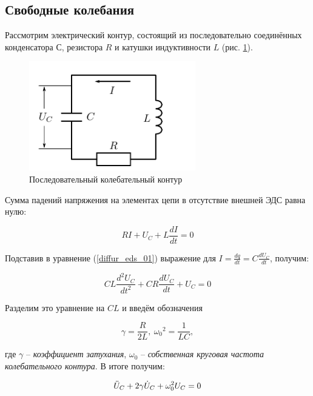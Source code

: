\documentclass[a4paper, 12pt]{article}
\begin{document}
    \subsection{Свободные колебания}

    Рассмотрим электрический контур, состоящий из последовательно соединённых конденсатора $С$, резистора $R$ и катушки индуктивности $L$ (рис. \ref{circuit1}).

    \begin{figure}[H]
        \centering
        \includegraphics{images/circuit_1.png}
        \caption{Последовательный колебательный контур}
        \label{circuit1}
    \end{figure}

    Сумма падений напряжения на элементах цепи в отсутствие внешней ЭДС равна нулю:

    \begin{equation}
        RI + U_C + L \frac{dI}{dt} = 0
        \label{diffur_eds_01}
    \end{equation}

    Подставив в уравнение (\ref{diffur_eds_01}) выражение для $I = \frac{dq}{dt} = C \frac{dU_C}{dt}$, получим:

    \begin{equation}
        CL \frac{d^2U_C}{dt^2} + CR \frac{dU_C}{dt} + U_C = 0
    \end{equation}

    Разделим это уравнение на $CL$ и введём обозначения

    \begin{equation}
        \gamma = \frac{R}{2L}, \: {\omega_0}^2 = \frac{1}{LC},
        \label{definition_1}
    \end{equation}

    где $\gamma$ -- \textit{коэффициент затухания}, $\omega_0$ -- \textit{собственная круговая частота колебательного контура}. В итоге получим:

    \begin{equation}
        \Ddot{U}_C + 2\gamma \Dot{U}_C + \omega_0^2 U_C = 0
        \label{diffur_eds_02}
    \end{equation}
\end{document}
